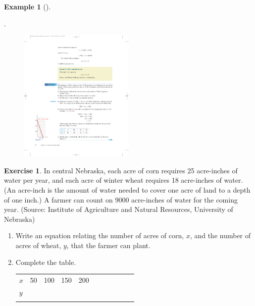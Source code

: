 \documentclass[10pt,]{book}
\theoremstyle{plain}
\theoremstyle{definition}
\theoremstyle{definition}
\newtheorem{example}[theorem]{Example}
\theoremstyle{definition}
\theoremstyle{definition}
\newtheorem{exercise}[theorem]{Exercise}
\numberwithin{equation}{section}
\newcommand{\hrulethin}  {\noalign{\hrule height 0.04em}}
\newcommand{\hrulethick} {\noalign{\hrule height 0.11em}}
\begin{document}
\begin{example}[]
\begin{enumerate}[label=*\alph**]
.
        \leavevmode%
\begin{figure}
\centering
\includegraphics[width=0.50\textwidth,]{images/fig-example-advertising.pdf}\caption{\label{fig-example-advertising}}
\end{figure}
%
\end{enumerate}
\end{example}
\begin{exercise}\label{exercise-crops}
In central Nebraska, each acre of corn requires 25 acre-inches of water per year, and each acre of winter wheat requires 18 acre-inches of water.             (An acre-inch is the amount of water needed to cover one acre of land to a depth of one inch.)  A farmer can count on 9000 acre-inches of water for the coming year.  (Source:  Institute of Agriculture and Natural Resources, University of Nebraska)
    \leavevmode%
\begin{enumerate}[label=*\alph**]
\item\hypertarget{li-50}{}Write an equation relating the number of acres of corn, \(x\), and the number of acres of wheat, \(y\), that the farmer can plant.%
\item\hypertarget{li-51}{}Complete the table.%
\leavevmode%
\begin{table}
\centering
\begin{tabular}{AcAcAcAcAcA}\hrulethick
\(x\)&50&100&150&200\tabularnewline\hrulethin
\(y\)&&&&\tabularnewline\hrulethin
\end{tabular}
\end{table}
\end{enumerate}
%
\end{exercise}
\typeout{************************************************}
\typeout{************************************************}
\end{document}
